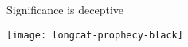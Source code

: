 \documentclass[t]{beamer}
\begin{document}
  \begin{frame}[c, plain]{}
  \end{frame}

  \begin{frame}[plain, c]{Significance is deceptive}

    \begin{center}
      \texttt{[image: longcat-prophecy-black]}
    \end{center}
      
  \end{frame}

  \begin{frame}[c, plain]{}
  \end{frame}

  
\end{document}
